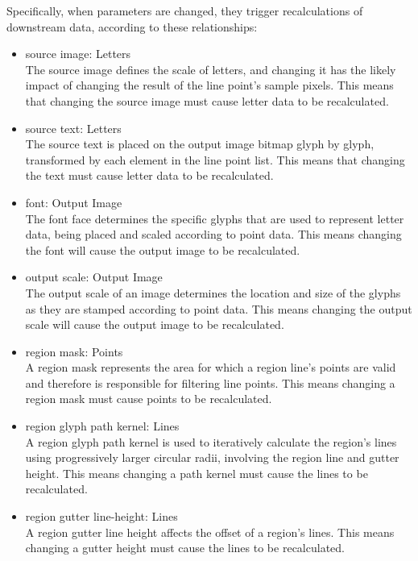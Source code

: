 Specifically, when parameters are changed, they trigger recalculations of downstream data, according to these relationships:
\begin{itemize}
  \item source image: Letters \\
        The source image defines the scale of letters, and changing it has the likely impact of changing the result of the line point's sample pixels.
        This means that changing the source image must cause letter data to be recalculated.

  \item source text: Letters \\
        The source text is placed on the output image bitmap glyph by glyph, transformed by each element in the line point list.
        This means that changing the text must cause letter data to be recalculated.

  \item font: Output Image \\
        The font face determines the specific glyphs that are used to represent letter data, being placed and scaled according to point data.
        This means changing the font will cause the output image to be recalculated.

  \item output scale: Output Image \\
        The output scale of an image determines the location and size of the glyphs as they are stamped according to point data.
        This means changing the output scale will cause the output image to be recalculated.

  \item region mask: Points \\
        A region mask represents the area for which a region line's points are valid and therefore is responsible for filtering line points.
        This means changing a region mask must cause points to be recalculated.

  \item region glyph path kernel: Lines \\
        A region glyph path kernel is used to iteratively calculate the region's lines using progressively larger circular radii, involving the region line and gutter height.
        This means changing a path kernel must cause the lines to be recalculated.

  \item region gutter line-height: Lines \\
        A region gutter line height affects the offset of a region's lines.
        This means changing a gutter height must cause the lines to be recalculated.


\end{itemize}
